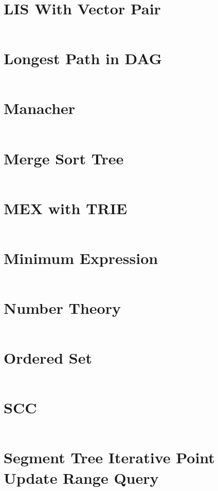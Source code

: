 \documentclass[10pt,a4paper,landscape]{article}
\begin{document}
\begin{multicols*}{3}
		\section{LIS With Vector Pair}
		\inputminted{cpp}{codes/LIS_WITH_VECTOR_PAIR.cpp}
		
		\section{Longest Path in DAG}
		\inputminted{cpp}{codes/LONGEST_PATH_IN_DAG.cpp}
		
		\section{Manacher}
		\inputminted{cpp}{codes/MANACHER.cpp}
		
		\section{Merge Sort Tree}
		\inputminted{cpp}{codes/MERGE_SORT_TREE.cpp}
		
		\section{MEX with TRIE}
		\inputminted{cpp}{codes/MEX_WITH_TRIE.cpp}
		
		\section{Minimum Expression}
		\inputminted{cpp}{codes/MINIMUM_EXPRESSION.cpp}
		
		\section{Number Theory}
		\inputminted{cpp}{codes/NUMBER_THEORY.cpp}
		
		\section{Ordered Set}
		\inputminted{cpp}{codes/ORDERED_SET.cpp}
		
		\section{SCC}
		\inputminted{cpp}{codes/SCC.cpp}
		
		\section{Segment Tree Iterative Point Update Range Query}
		\inputminted{cpp}{codes/SEGMENT_TREE_ITERATIVE_PointUpdate_RangeQuery.cpp}
		

\end{multicols*}
\end{document}
